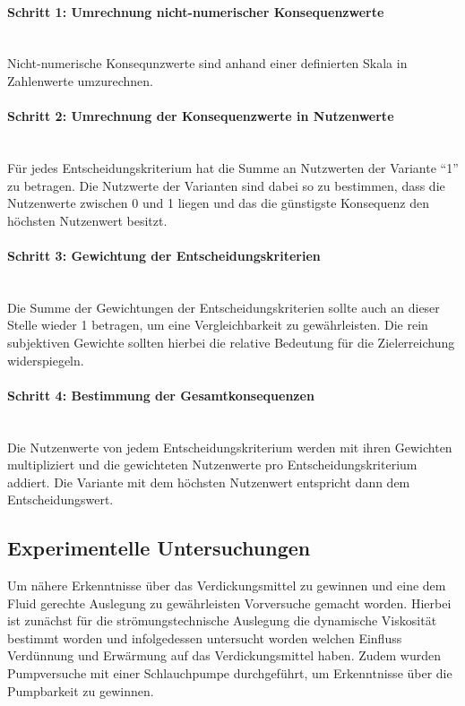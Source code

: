 \paragraph{Schritt 1: Umrechnung nicht-numerischer Konsequenzwerte}	\, \\
Nicht-numerische Konsequnzwerte sind anhand einer definierten Skala in Zahlenwerte umzurechnen.
\vspace*{-2.5mm}
\paragraph{Schritt 2: Umrechnung der Konsequenzwerte in Nutzenwerte} \, \\ 
Für jedes Entscheidungskriterium hat die Summe an Nutzwerten der Variante "`1"' zu betragen. Die Nutzwerte der Varianten sind dabei so zu bestimmen, dass die Nutzenwerte zwischen $0$ und 1 liegen und das die günstigste Konsequenz den höchsten Nutzenwert besitzt.
\vspace*{-2.5mm}
\paragraph{Schritt 3: Gewichtung der Entscheidungskriterien} \, \\
Die Summe der Gewichtungen der Entscheidungskriterien sollte auch an dieser Stelle wieder 1 betragen, um eine Vergleichbarkeit zu gewährleisten. Die rein subjektiven Gewichte sollten hierbei die relative Bedeutung für die Zielerreichung widerspiegeln.
\vspace*{-7.5mm}
\paragraph{Schritt 4: Bestimmung der Gesamtkonsequenzen} \, \\
Die Nutzenwerte von jedem Entscheidungskriterium werden mit ihren Gewichten multipliziert und die gewichteten Nutzenwerte pro Entscheidungskriterium addiert. Die Variante mit dem höchsten Nutzenwert entspricht dann dem Entscheidungswert.

\subsection{Experimentelle Untersuchungen}
Um nähere Erkenntnisse über das Verdickungsmittel zu gewinnen und eine dem Fluid gerechte Auslegung zu gewährleisten  Vorversuche gemacht worden. Hierbei ist zunächst für die strömungstechnische Auslegung die dynamische Viskosität bestimmt worden und infolgedessen untersucht worden welchen Einfluss Verdünnung und Erwärmung auf das Verdickungsmittel haben. Zudem wurden Pumpversuche mit einer Schlauchpumpe durchgeführt, um Erkenntnisse über die Pumpbarkeit zu gewinnen.

